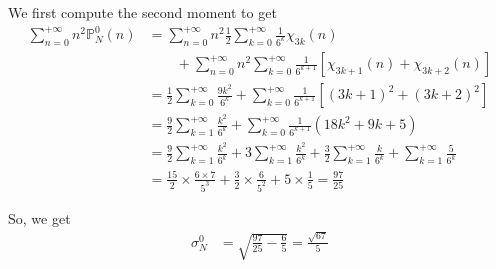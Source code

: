 \documentclass[a4paper,oneside,11pt]{book}
\renewcommand{\Pr}{\mathbb{P}}
\begin{document}
We first compute the second moment to get
\begin{align}
	\sum_{n=0}^{+\infty}
	n^2\Pr_N^0\left(n\right)
	&=\sum_{n=0}^{+\infty}n^2
	\frac12\sum_{k=0}^{+\infty}\frac1{6^k}\chi_{3k}(n)
\\
	&\qquad+\sum_{n=0}^{+\infty}n^2
	\sum_{k=0}^{+\infty}\frac1{6^{k+1}}
	\left[
		\chi_{3k+1}(n)
		+\chi_{3k+2}(n)
	\right]
\\
	&=\frac12\sum_{k=0}^{+\infty}\frac{9k^2}{6^k}
	+\sum_{k=0}^{+\infty}\frac1{6^{k+1}}
	\left[
		\left(3k+1\right)^2
		+\left(3k+2\right)^2
	\right]
\\
	&=\frac92\sum_{k=1}^{+\infty}\frac{ k^2}{6^k}
	+\sum_{k=0}^{+\infty}\frac1{6^{k+1}}
	\left(
		18k^2
		+9k
		+5
	\right)
\\
	&=\frac92\sum_{k=1}^{+\infty}\frac{ k^2}{6^k}
	+3\sum_{k=1}^{+\infty}\frac{k^2}{6^k}
	+\frac32\sum_{k=1}^{+\infty}\frac k{6^k}
	+\sum_{k=1}^{+\infty}\frac5{6^k}
\\
	&=\frac{15}2\times\frac{6\times7}{5^3}
	+\frac32\times\frac{6}{5^2}
	+5\times\frac15
	=\frac{97}{25}
\end{align}

So, we get
\begin{align}
	\sigma_N^0
	&=\sqrt{\frac{97}{25}-\frac{6}{5}}
	=\frac{\sqrt{67}}5
 \end{align}
\end{document}
